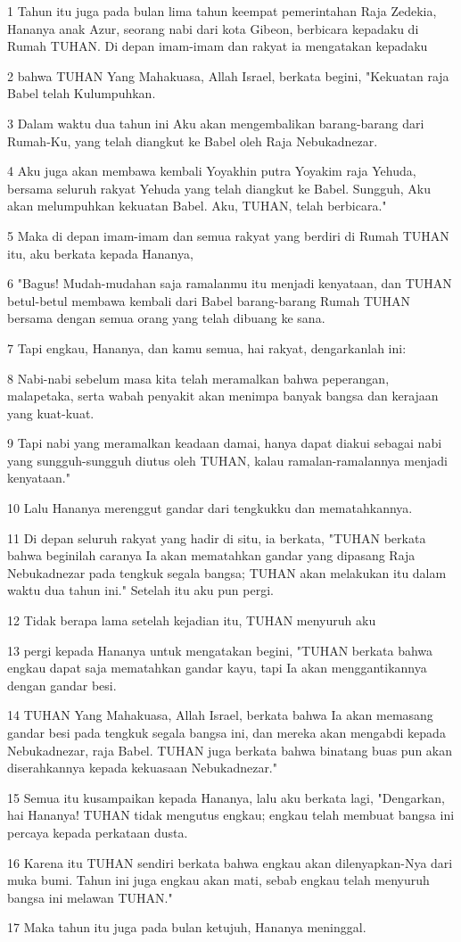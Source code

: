 \par 1 Tahun itu juga pada bulan lima tahun keempat pemerintahan Raja Zedekia, Hananya anak Azur, seorang nabi dari kota Gibeon, berbicara kepadaku di Rumah TUHAN. Di depan imam-imam dan rakyat ia mengatakan kepadaku
\par 2 bahwa TUHAN Yang Mahakuasa, Allah Israel, berkata begini, "Kekuatan raja Babel telah Kulumpuhkan.
\par 3 Dalam waktu dua tahun ini Aku akan mengembalikan barang-barang dari Rumah-Ku, yang telah diangkut ke Babel oleh Raja Nebukadnezar.
\par 4 Aku juga akan membawa kembali Yoyakhin putra Yoyakim raja Yehuda, bersama seluruh rakyat Yehuda yang telah diangkut ke Babel. Sungguh, Aku akan melumpuhkan kekuatan Babel. Aku, TUHAN, telah berbicara."
\par 5 Maka di depan imam-imam dan semua rakyat yang berdiri di Rumah TUHAN itu, aku berkata kepada Hananya,
\par 6 "Bagus! Mudah-mudahan saja ramalanmu itu menjadi kenyataan, dan TUHAN betul-betul membawa kembali dari Babel barang-barang Rumah TUHAN bersama dengan semua orang yang telah dibuang ke sana.
\par 7 Tapi engkau, Hananya, dan kamu semua, hai rakyat, dengarkanlah ini:
\par 8 Nabi-nabi sebelum masa kita telah meramalkan bahwa peperangan, malapetaka, serta wabah penyakit akan menimpa banyak bangsa dan kerajaan yang kuat-kuat.
\par 9 Tapi nabi yang meramalkan keadaan damai, hanya dapat diakui sebagai nabi yang sungguh-sungguh diutus oleh TUHAN, kalau ramalan-ramalannya menjadi kenyataan."
\par 10 Lalu Hananya merenggut gandar dari tengkukku dan mematahkannya.
\par 11 Di depan seluruh rakyat yang hadir di situ, ia berkata, "TUHAN berkata bahwa beginilah caranya Ia akan mematahkan gandar yang dipasang Raja Nebukadnezar pada tengkuk segala bangsa; TUHAN akan melakukan itu dalam waktu dua tahun ini." Setelah itu aku pun pergi.
\par 12 Tidak berapa lama setelah kejadian itu, TUHAN menyuruh aku
\par 13 pergi kepada Hananya untuk mengatakan begini, "TUHAN berkata bahwa engkau dapat saja mematahkan gandar kayu, tapi Ia akan menggantikannya dengan gandar besi.
\par 14 TUHAN Yang Mahakuasa, Allah Israel, berkata bahwa Ia akan memasang gandar besi pada tengkuk segala bangsa ini, dan mereka akan mengabdi kepada Nebukadnezar, raja Babel. TUHAN juga berkata bahwa binatang buas pun akan diserahkannya kepada kekuasaan Nebukadnezar."
\par 15 Semua itu kusampaikan kepada Hananya, lalu aku berkata lagi, "Dengarkan, hai Hananya! TUHAN tidak mengutus engkau; engkau telah membuat bangsa ini percaya kepada perkataan dusta.
\par 16 Karena itu TUHAN sendiri berkata bahwa engkau akan dilenyapkan-Nya dari muka bumi. Tahun ini juga engkau akan mati, sebab engkau telah menyuruh bangsa ini melawan TUHAN."
\par 17 Maka tahun itu juga pada bulan ketujuh, Hananya meninggal.

